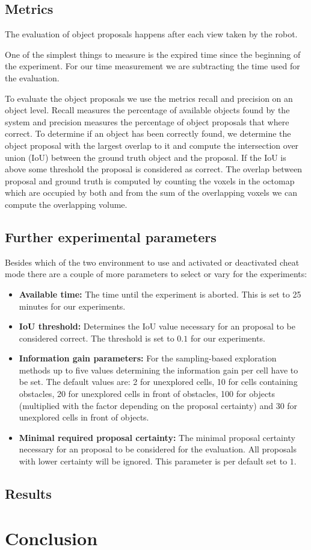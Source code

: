 \documentclass[a4paper,11pt,english]{article}
\begin{document}
\subsection{Metrics}
The evaluation of object proposals happens after each view taken by the robot.

One of the simplest things to measure is the expired time since the beginning of the experiment.
For our time measurement we are subtracting the time used for the evaluation.

To evaluate the object proposals we use the metrics recall and precision on an object level.
Recall measures the percentage of available objects found by the system and precision measures the percentage of object proposals that where correct.
To determine if an object has been correctly found, we determine the object proposal with the largest overlap to it and compute the intersection over union (IoU) between the ground truth object and the proposal.
If the IoU is above some threshold the proposal is considered as correct.
The overlap between proposal and ground truth is computed by counting the voxels in the octomap which are occupied by both and from the sum of the overlapping voxels we can compute the overlapping volume.

\subsection{Further experimental parameters}
Besides which of the two environment to use and activated or deactivated cheat mode there are a couple of more parameters to select or vary for the experiments:

\begin{itemize}
	\item \textbf{Available time:} The time until the experiment is aborted. This is set to 25 minutes for our experiments.
	\item \textbf{IoU threshold:} Determines the IoU value necessary for an proposal to be considered correct. The threshold is set to $0.1$ for our experiments.
	\item \textbf{Information gain parameters:} For the sampling-based exploration methods up to five values determining the information gain per cell have to be set. The default values are: 2 for unexplored cells, 10 for cells containing obstacles, 20 for unexplored cells in front of obstacles, 100 for objects (multiplied with the factor depending on the proposal certainty) and 30 for unexplored cells in front of objects.
	\item \textbf{Minimal required proposal certainty:} The minimal proposal certainty necessary for an proposal to be considered for the evaluation. All proposals with lower certainty will be ignored. This parameter is per default set to $1$.
\end{itemize}

\subsection{Results}

\section{Conclusion}
\label{Conclusion}



\newpage


\end{document}

